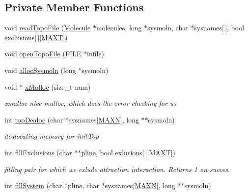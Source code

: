 \subsection*{Private Member Functions}
\begin{DoxyCompactItemize}
\item 
void \hyperlink{class_inicializer_acd2d40a23bdd29b973176c62ab5aef8d}{read\+Topo\+File} (\hyperlink{class_molecule}{Molecule} $\ast$molecules, long $\ast$sysmoln, char $\ast$sysnames\mbox{[}$\,$\mbox{]}, bool exclusions\mbox{[}$\,$\mbox{]}\mbox{[}\hyperlink{macros_8h_a3f79fdecc884eb98c97d1bdc77455295}{M\+A\+X\+T}\mbox{]})
\item 
void \hyperlink{class_inicializer_ae0b9e84765b73f78e05aa6c5e99dcc68}{open\+Topo\+File} (F\+I\+L\+E $\ast$infile)
\item 
void \hyperlink{class_inicializer_a1d3e25551f9a48a112d20e9680205d76}{alloc\+Sysmoln} (long $\ast$sysmoln)
\item 
void $\ast$ \hyperlink{class_inicializer_a271a0eef3110b4f1557c7b43d2e0320c}{x\+Malloc} (size\+\_\+t num)
\begin{DoxyCompactList}\small\item\em xmalloc nice malloc, which does the error checking for us \end{DoxyCompactList}\item 
int \hyperlink{class_inicializer_ada4af3101e860931ce8f1c52d0bd7555}{top\+Dealoc} (char $\ast$sysnames\mbox{[}\hyperlink{macros_8h_ad1f79d9d99776d7353c6659c307c83c6}{M\+A\+X\+N}\mbox{]}, long $\ast$$\ast$sysmoln)
\begin{DoxyCompactList}\small\item\em dealocating memory for init\+Top \end{DoxyCompactList}\item 
int \hyperlink{class_inicializer_a637c5bb05ee307ee3a37a933a28043d0}{fill\+Exclusions} (char $\ast$$\ast$pline, bool exlusions\mbox{[}$\,$\mbox{]}\mbox{[}\hyperlink{macros_8h_a3f79fdecc884eb98c97d1bdc77455295}{M\+A\+X\+T}\mbox{]})
\begin{DoxyCompactList}\small\item\em filling pair for which we exlude attraction interaction. Returns 1 on succes. \end{DoxyCompactList}\item 
int \hyperlink{class_inicializer_a7307f2946c9106e2705aeb3b53fb1c16}{fill\+System} (char $\ast$pline, char $\ast$sysnames\mbox{[}\hyperlink{macros_8h_ad1f79d9d99776d7353c6659c307c83c6}{M\+A\+X\+N}\mbox{]}, long $\ast$$\ast$sysmoln)
$$
\end{DoxyCompactItemize}
